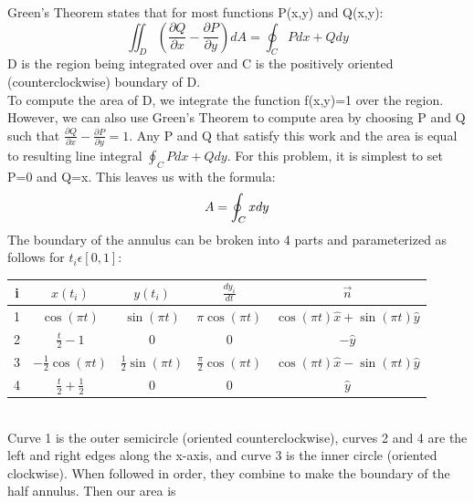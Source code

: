 \documentclass{article}
\begin{document}
Green's Theorem states that for most functions P(x,y) and Q(x,y):
\begin{equation*}
\iint_{D}(\frac{\partial Q}{\partial x}-\frac{\partial P}{\partial y})dA=\oint_{C}Pdx+Qdy
\end{equation*}
D is the region being integrated over and C is the positively oriented (counterclockwise) boundary of D.\\
To compute the area of D, we integrate the function f(x,y)=1 over the region. However, we can also use Green's Theorem to compute area by choosing P and Q such that $\frac{\partial Q}{\partial x}-\frac{\partial P}{\partial y}=1$. Any P and Q that satisfy this work and the area is equal to resulting line integral $\oint_{C}Pdx+Qdy$. For this problem, it is simplest to set P=0 and Q=x. This leaves us with the formula:
\begin{equation*}
A=\oint_{C}x\space dy
\end{equation*}
The boundary of the annulus can be broken into 4 parts and parameterized as follows for $t_i\epsilon[0,1]$:\\
\begin{center}
  \begin{tabular}{|c|c|c|c|c|}
      \hline
    i & $x(t_i)$ & $y(t_i)$ & $\frac{dy_i}{dt}$ & $\vec{n}$ \\
        \hline
        1 & $\cos(\pi t)$ & $\sin(\pi t)$ & $\pi \cos(\pi t)$ & $\cos(\pi t)\hat{x}+\sin(\pi t)\hat{y}$ \\
        \hline
        2 & $\frac{t}{2}-1$ & 0 & 0 & $-\hat{y}$ \\
        \hline
        3 & $-\frac{1}{2}\cos(\pi t)$ & $\frac{1}{2}\sin(\pi t)$ & $\frac{\pi}{2} \cos(\pi t)$ & $\cos(\pi t)\hat{x}-\sin(\pi t)\hat{y}$ \\
        \hline
        4 & $\frac{t}{2}+\frac{1}{2}$ & 0 & 0 & $\hat{y}$ \\
        \hline
    \end{tabular}
\end{center}
\mbox{}\\
Curve 1 is the outer semicircle (oriented counterclockwise), curves 2 and 4 are the left and right edges along the x-axis, and curve 3 is the inner circle (oriented clockwise). When followed in order, they combine to make the boundary of the half annulus. Then our area is
\end{document}
